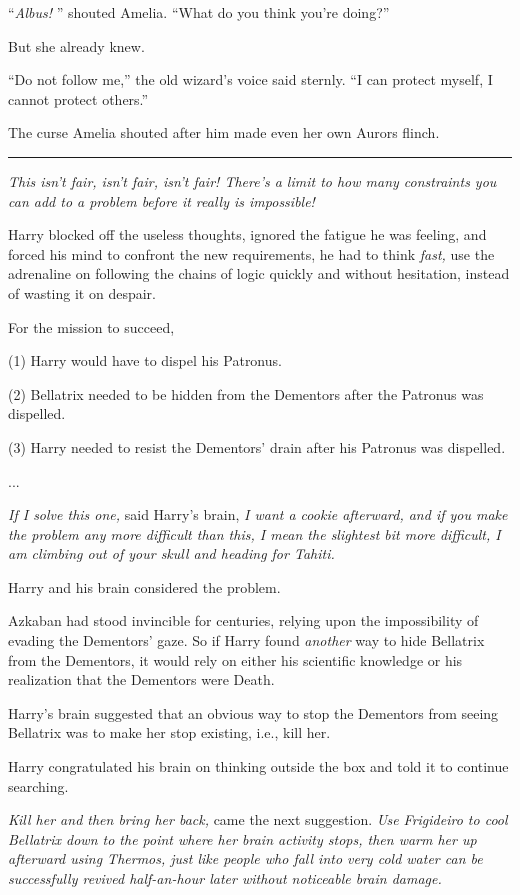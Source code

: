 ``\emph{Albus!} '' shouted Amelia. ``What do you think you're doing?''

But she already knew.

``Do not follow me,'' the old wizard's voice said sternly. ``I can
protect myself, I cannot protect others.''

The curse Amelia shouted after him made even her own Aurors flinch.

\begin{center}\rule{3in}{0.4pt}\end{center}

\emph{This isn't fair, isn't fair, isn't fair! There's a limit to how
many constraints you can add to a problem before it really is
impossible!}

Harry blocked off the useless thoughts, ignored the fatigue he was
feeling, and forced his mind to confront the new requirements, he had to
think \emph{fast,} use the adrenaline on following the chains of logic
quickly and without hesitation, instead of wasting it on despair.

For the mission to succeed,

(1) Harry would have to dispel his Patronus.

(2) Bellatrix needed to be hidden from the Dementors after the Patronus
was dispelled.

(3) Harry needed to resist the Dementors' drain after his Patronus was
dispelled.

...

\emph{If I solve this one,} said Harry's brain, \emph{I want a cookie
afterward, and if you make the problem any more difficult than this, I
mean the slightest bit more difficult, I am climbing out of your skull
and heading for Tahiti.}

Harry and his brain considered the problem.

Azkaban had stood invincible for centuries, relying upon the
impossibility of evading the Dementors' gaze. So if Harry found
\emph{another} way to hide Bellatrix from the Dementors, it would rely
on either his scientific knowledge or his realization that the Dementors
were Death.

Harry's brain suggested that an obvious way to stop the Dementors from
seeing Bellatrix was to make her stop existing, i.e., kill her.

Harry congratulated his brain on thinking outside the box and told it to
continue searching.

\emph{Kill her and then bring her back,} came the next suggestion.
\emph{Use Frigideiro to cool Bellatrix down to the point where her brain
activity stops, then warm her up afterward using Thermos, just like
people who fall into very cold water can be successfully revived
half-an-hour later without noticeable brain damage.}

